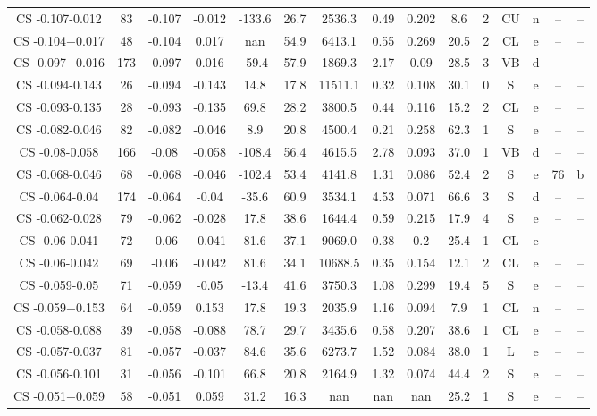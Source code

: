 \begin{table}
\begin{tabular}{ccccccccccccccc}
CS -0.107-0.012 & 83 & -0.107 & -0.012 & -133.6 & 26.7 & 2536.3 & 0.49 & 0.202 & 8.6 & 2 & CU & n & -- & -- \\
CS -0.104+0.017 & 48 & -0.104 & 0.017 & nan & 54.9 & 6413.1 & 0.55 & 0.269 & 20.5 & 2 & CL & e & -- & -- \\
CS -0.097+0.016 & 173 & -0.097 & 0.016 & -59.4 & 57.9 & 1869.3 & 2.17 & 0.09 & 28.5 & 3 & VB & d & -- & -- \\
CS -0.094-0.143 & 26 & -0.094 & -0.143 & 14.8 & 17.8 & 11511.1 & 0.32 & 0.108 & 30.1 & 0 & S & e & -- & -- \\
CS -0.093-0.135 & 28 & -0.093 & -0.135 & 69.8 & 28.2 & 3800.5 & 0.44 & 0.116 & 15.2 & 2 & CL & e & -- & -- \\
CS -0.082-0.046 & 82 & -0.082 & -0.046 & 8.9 & 20.8 & 4500.4 & 0.21 & 0.258 & 62.3 & 1 & S & e & -- & -- \\
CS -0.08-0.058 & 166 & -0.08 & -0.058 & -108.4 & 56.4 & 4615.5 & 2.78 & 0.093 & 37.0 & 1 & VB & d & -- & -- \\
CS -0.068-0.046 & 68 & -0.068 & -0.046 & -102.4 & 53.4 & 4141.8 & 1.31 & 0.086 & 52.4 & 2 & S & e & 76 & b \\
CS -0.064-0.04 & 174 & -0.064 & -0.04 & -35.6 & 60.9 & 3534.1 & 4.53 & 0.071 & 66.6 & 3 & S & d & -- & -- \\
CS -0.062-0.028 & 79 & -0.062 & -0.028 & 17.8 & 38.6 & 1644.4 & 0.59 & 0.215 & 17.9 & 4 & S & e & -- & -- \\
CS -0.06-0.041 & 72 & -0.06 & -0.041 & 81.6 & 37.1 & 9069.0 & 0.38 & 0.2 & 25.4 & 1 & CL & e & -- & -- \\
CS -0.06-0.042 & 69 & -0.06 & -0.042 & 81.6 & 34.1 & 10688.5 & 0.35 & 0.154 & 12.1 & 2 & CL & e & -- & -- \\
CS -0.059-0.05 & 71 & -0.059 & -0.05 & -13.4 & 41.6 & 3750.3 & 1.08 & 0.299 & 19.4 & 5 & S & e & -- & -- \\
CS -0.059+0.153 & 64 & -0.059 & 0.153 & 17.8 & 19.3 & 2035.9 & 1.16 & 0.094 & 7.9 & 1 & CL & n & -- & -- \\
CS -0.058-0.088 & 39 & -0.058 & -0.088 & 78.7 & 29.7 & 3435.6 & 0.58 & 0.207 & 38.6 & 1 & CL & e & -- & -- \\
CS -0.057-0.037 & 81 & -0.057 & -0.037 & 84.6 & 35.6 & 6273.7 & 1.52 & 0.084 & 38.0 & 1 & L & e & -- & -- \\
CS -0.056-0.101 & 31 & -0.056 & -0.101 & 66.8 & 20.8 & 2164.9 & 1.32 & 0.074 & 44.4 & 2 & S & e & -- & -- \\
CS -0.051+0.059 & 58 & -0.051 & 0.059 & 31.2 & 16.3 & nan & nan & nan & 25.2 & 1 & S & e & -- & -- \\

\end{tabular}
\end{table}
